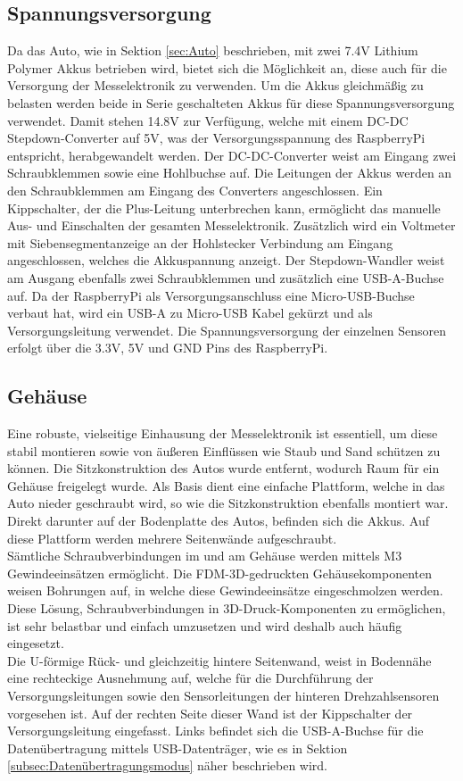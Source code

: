 \subsection{Spannungsversorgung}
\label{subsec:elekSupply}
Da das Auto, wie in Sektion \ref{sec:Auto} beschrieben, mit zwei 7.4\ac{V} Lithium Polymer Akkus betrieben wird, bietet sich die Möglichkeit an, diese auch für die Versorgung der Messelektronik zu verwenden. Um die Akkus gleichmäßig zu belasten werden beide in Serie geschalteten Akkus für diese Spannungsversorgung verwendet. Damit stehen 14.8\ac{V} zur Verfügung, welche mit einem DC-DC Stepdown-Converter auf 5\ac{V}, was der Versorgungsspannung des RaspberryPi entspricht, herabgewandelt werden. Der DC-DC-Converter weist am Eingang zwei Schraubklemmen sowie eine Hohlbuchse auf. Die Leitungen der Akkus werden an den Schraubklemmen am Eingang des Converters angeschlossen. Ein Kippschalter, der die Plus-Leitung unterbrechen kann, ermöglicht das manuelle Aus- und Einschalten der gesamten Messelektronik. Zusätzlich wird ein Voltmeter mit Siebensegmentanzeige an der Hohlstecker Verbindung am Eingang angeschlossen, welches die Akkuspannung anzeigt. Der Stepdown-Wandler weist am Ausgang ebenfalls zwei Schraubklemmen und zusätzlich eine \ac{USB}-A-Buchse auf. Da der RaspberryPi als Versorgungsanschluss eine Micro-\ac{USB}-Buchse verbaut hat, wird ein USB-A zu Micro-\ac{USB} Kabel gekürzt und als Versorgungsleitung verwendet. Die Spannungsversorgung der einzelnen Sensoren erfolgt über die 3.3\ac{V}, 5\ac{V} und GND Pins des RaspberryPi.

\subsection{Gehäuse}
\label{subsec:elekCasing}
Eine robuste, vielseitige Einhausung der Messelektronik ist essentiell, um diese stabil montieren sowie von äußeren Einflüssen wie Staub und Sand schützen zu können. Die Sitzkonstruktion des Autos wurde entfernt, wodurch Raum für ein Gehäuse freigelegt wurde. Als Basis dient eine einfache Plattform, welche in das Auto nieder geschraubt wird, so wie die Sitzkonstruktion ebenfalls montiert war. Direkt darunter auf der Bodenplatte des Autos, befinden sich die Akkus. Auf diese Plattform werden mehrere Seitenwände aufgeschraubt.\\
Sämtliche Schraubverbindungen im und am Gehäuse werden mittels M3 Gewindeeinsätzen ermöglicht. Die \ac{FDM}-3D-gedruckten Gehäusekomponenten weisen Bohrungen auf, in welche diese Gewindeeinsätze eingeschmolzen werden. Diese Lösung, Schraubverbindungen in 3D-Druck-Komponenten zu ermöglichen, ist sehr belastbar und einfach umzusetzen und wird deshalb auch häufig eingesetzt. \\
Die U-förmige Rück- und gleichzeitig hintere Seitenwand, weist in Bodennähe eine rechteckige Ausnehmung auf, welche für die Durchführung der Versorgungsleitungen sowie den Sensorleitungen der hinteren Drehzahlsensoren vorgesehen ist. Auf der rechten Seite dieser Wand ist der Kippschalter der Versorgungsleitung eingefasst. Links befindet sich die \ac{USB}-A-Buchse für die Datenübertragung mittels \ac{USB}-Datenträger, wie es in Sektion \ref{subsec:Datenübertragungsmodus} näher beschrieben wird.